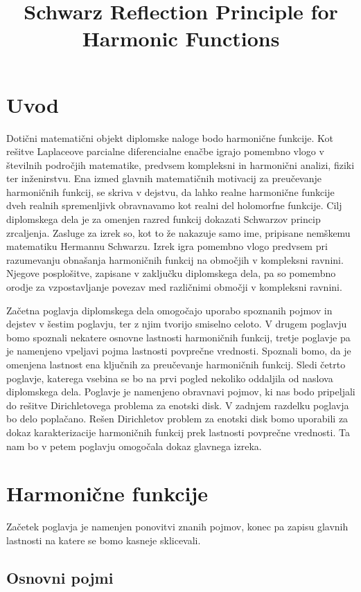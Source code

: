 \documentclass[mat1, tisk]{fmfdelo}
\title{Schwarz Reflection Principle for Harmonic Functions}
\begin{document}
\section{Uvod}

Dotični matematični objekt diplomske naloge bodo harmonične funkcije. 
Kot rešitve Laplaceove parcialne diferencialne enačbe igrajo pomembno vlogo v številnih področjih matematike, predvsem kompleksni in harmonični analizi, fiziki ter inženirstvu. 
Ena izmed glavnih matematičnih motivacij za preučevanje harmoničnih funkcij, se skriva v dejstvu, da lahko realne harmonične funkcije dveh realnih spremenljivk obravnavamo kot realni del holomorfne funkcije.
Cilj diplomskega dela je za omenjen razred funkcij dokazati Schwarzov princip zrcaljenja.
Zasluge za izrek so, kot to že nakazuje samo ime, pripisane nemškemu matematiku Hermannu Schwarzu.
Izrek igra pomembno vlogo predvsem pri razumevanju obnašanja harmoničnih funkcij na območjih v kompleksni ravnini. 
Njegove posplošitve, zapisane v zaključku diplomskega dela, pa so pomembno orodje za vzpostavljanje povezav med različnimi območji v kompleksni ravnini.

Začetna poglavja diplomskega dela omogočajo uporabo spoznanih pojmov in dejstev v šestim poglavju, ter z njim tvorijo smiselno celoto.
V drugem poglavju bomo spoznali nekatere osnovne lastnosti harmoničnih funkcij, tretje poglavje pa je namenjeno vpeljavi pojma lastnosti povprečne vrednosti. 
Spoznali bomo, da je omenjena lastnost ena ključnih za preučevanje harmoničnih funkcij. 
Sledi četrto poglavje, katerega vsebina se bo na prvi pogled nekoliko oddaljila od naslova diplomskega dela. 
Poglavje je namenjeno obravnavi pojmov, ki nas bodo pripeljali do rešitve Dirichletovega problema za enotski disk.
V zadnjem razdelku poglavja bo delo poplačano. Rešen Dirichletov problem za enotski disk bomo uporabili za dokaz karakterizacije harmoničnih funkcij prek lastnosti povprečne vrednosti.
Ta nam bo v petem poglavju omogočala dokaz glavnega izreka. 

\section{Harmonične funkcije}

Začetek poglavja je namenjen ponovitvi znanih pojmov, konec pa zapisu glavnih lastnosti na katere se bomo kasneje sklicevali. 

\subsection{Osnovni pojmi}
\end{document}
